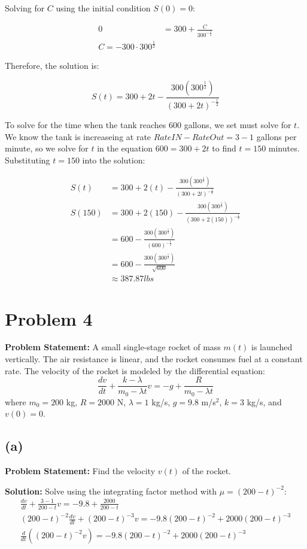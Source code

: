 \documentclass[12pt, letterpaper]{article}
\begin{document}
Solving for $C$ using the initial condition $S(0) = 0$:

\begin{align*}
0 &= 300 + \frac{C}{300^{-\frac{1}{2}}} \\
C = -300 \cdot 300^\frac{1}{2} 
\end{align*}

Therefore, the solution is:

\[ 
S(t) = 300 + 2t - \frac{300(300^\frac{1}{2})}{(300+2t)^{-\frac{1}{2}}}
\]

To solve for the time when the tank reaches 600 gallons, we set must solve for $t$. We know the tank is increaseing at rate $RateIN - RateOut = 3-1$ gallons per minute, so we solve for $t$ in the equation $600 = 300 + 2t$ to find $t = 150$ minutes. Substituting $t = 150$ into the solution:

\begin{align*}
S(t) &= 300 + 2(t) - \frac{300(300^\frac{1}{2})}{(300+2t)^{-\frac{1}{2}}} \\
S(150) &= 300 + 2(150) - \frac{300(300^\frac{1}{2})}{(300+2(150))^{-\frac{1}{2}}} \\
&= 600 - \frac{300(300^\frac{1}{2})}{(600)^{-\frac{1}{2}}} \\
&= 600 - \frac{300(300^\frac{1}{2})}{\sqrt{600}} \\
&\approx 387.87 lbs
\end{align*}
    
\section*{Problem 4}
\textbf{Problem Statement:}
A small single-stage rocket of mass $m(t)$ is launched vertically. The air resistance is linear, and the rocket consumes fuel at a constant rate. The velocity of the rocket is modeled by the differential equation:
\[
\frac{dv}{dt} + \frac{k - \lambda}{m_0 - \lambda t} v = -g + \frac{R}{m_0 - \lambda t}
\]
where $m_0 = 200$ kg, $R = 2000$ N, $\lambda = 1$ kg/s, $g = 9.8$ m/s\(^2\), $k = 3$ kg/s, and $v(0) = 0$.

\subsection*{(a)}
\textbf{Problem Statement:}
Find the velocity $v(t)$ of the rocket.

\textbf{Solution:}
Solve using the integrating factor method with $\mu = (200-t)^{-2}$:
\begin{align*}
\frac{dv}{dt} + \frac{3-1}{200-t}v = -9.8 + \frac{2000}{200-t} \\
(200-t)^{-2} \frac{dv}{dt} + (200-t)^{-3}v = -9.8(200-t)^{-2} + 2000(200-t)^{-3} \\
\frac{d}{dt}((200-t)^{-2}v) = -9.8(200-t)^{-2} + 2000(200-t)^{-3} \\
\end{align*}
\end{document}
